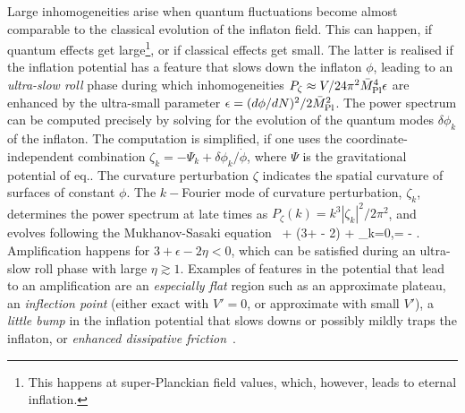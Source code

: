 Large inhomogeneities arise when quantum fluctuations become almost
comparable to the classical evolution of the inflaton field.
This can happen, if quantum effects get large\footnote{This happens at super-Planckian field values, which, however, leads to eternal inflation.},
or if classical effects get small.
The latter is realised if the inflation potential has a feature that slows down the inflaton $\phi$,
leading to an {\em ultra-slow roll} phase during which inhomogeneities
$P_\zeta \approx V/24\pi^2 \bar{M}_{\rm Pl}^4\epsilon$ are enhanced by the ultra-small parameter
$\epsilon = (d\phi/dN)^2/2\bar{M}_{\rm Pl}^2$.
The power spectrum can be computed precisely by solving for
the evolution of the quantum modes $\delta \phi_k$ of the inflaton. The computation is simplified, if one uses the
coordinate-independent combination
$\zeta_k = -\Psi_k +  \delta\phi_k/\dot\phi$, where $\Psi$ is the gravitational potential of eq..
The curvature perturbation $\zeta$ indicates the spatial curvature of surfaces of constant $\phi$.
The $k-$Fourier mode of curvature perturbation, $\zeta_k$, 
determines the power spectrum at late times as $P_\zeta(k) = k^3 |\zeta_k|^2/2\pi^2$,
and evolves following the Mukhanov-Sasaki equation~\cite{MS}
\beq \label{eq:MS2}
+ (3+ \epsilon- 2\eta)  + 
 \zeta_k=0,\qquad \eta = \epsilon -  \ln \epsilon.
\eeq
Amplification happens for  $3+ \epsilon- 2\eta<0$, 
which can be satisfied during an ultra-slow roll  phase with large $\eta \gtrsim 1$.
Examples of features in the potential that lead to an amplification are an {\em especially flat} region 
such as an approximate plateau, an {\em inflection point} (either exact with $V'=0$, or approximate with small $V'$),
a {\em little bump} in the inflation potential that slows downs or possibly mildly traps the inflaton,
or {\em enhanced dissipative friction}~\cite{PBHformationTh,HiggsPlateau}.

